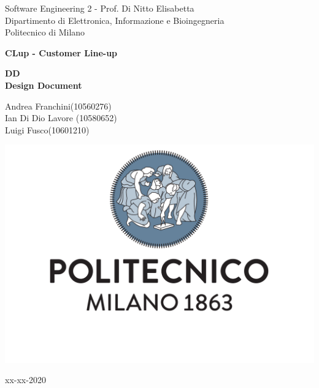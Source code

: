 \documentclass[a4paper]{article}
\begin{document}
\begin{titlepage}
	\centering
    
    {\normalsize 
        Software Engineering 2 - Prof. Di Nitto Elisabetta \\ 
		Dipartimento di Elettronica, Informazione e Bioingegneria \\
        Politecnico di Milano \par
    }     \vspace{3cm}

    {\Huge \textbf{CLup - Customer Line-up\\} }    \vspace{1cm}
  
    {\large \textbf{DD\\Design Document} \par}     \vspace{4cm}

	{\normalsize Andrea Franchini(10560276) \\ Ian Di Dio Lavore (10580652)\\ Luigi Fusco(10601210)\par}     \vspace{3cm}

    \includegraphics[scale=0.4]{images/logo.pdf}
    \vspace{0.5cm}

	{\normalsize xx-xx-2020 \par}
	
\end{titlepage}

\tableofcontents

    
    
    
    
    
    
    

    
\end{document}
